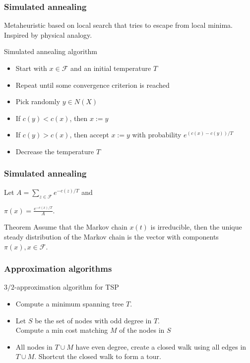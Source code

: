 \documentclass[9pt]{beamer}
\begin{document}
\begin{frame}
\frametitle{Simulated annealing}
Metaheuristic based on  local search that tries to escape from local minima.\\
Inspired by physical analogy.
\begin{block}{Simulated annealing algorithm}
\begin{itemize}
\item<1-> \alert{Start} with $x\in \mathcal F$ and an initial temperature $T$\bigskip

\item<1-> \alert{Repeat} until some convergence criterion is reached\bigskip

\item<1-> \alert{Pick} randomly $y\in N(X)$\bigskip

\item<1-> \alert{If} $c(y)<c(x)$, \alert{then} $x:=y$\bigskip

\item<1-> \alert{If} $c(y)> c(x)$, \alert{then accept} $x:=y$ with 
probability $e^{(c(x)-c(y))/T}$\bigskip

\item<1-> \alert{Decrease} the temperature $T$
\end{itemize}
\end{block}
\end{frame}
\begin{frame}
\frametitle{Simulated annealing}
Let $A= \sum_{z\in \mathcal F} e^{-c(z)/T}$ and \bigskip

$\pi(x) = \frac{e^{-c(x)/T}}{A}.$\bigskip

\begin{block}{Theorem}
Assume that the Markov chain $x(t)$ is irreducible, then the unique steady
distribution of the Markov chain is the vector with components
$\pi(x), x\in \mathcal F$.
\end{block}
\end{frame}
\begin{frame}
\frametitle{Approximation algorithms}
\begin{block}{$3/2$-approximation algorithm for TSP}
\begin{itemize}
\item<1-> Compute a \alert{minimum spanning tree} $T$.\bigskip

\item<1-> Let $S$ be the set of nodes with \alert{odd degree} in $T$.\\
Compute a min cost matching $M$ of the nodes in $S$
\bigskip
\item<1-> All nodes in $T\cup M$ have even degree, create a closed walk using all 
edges in $T\cup M$. Shortcut the closed walk to form a tour.
\end{itemize}
\end{block}
\end{frame}
\end{document}
